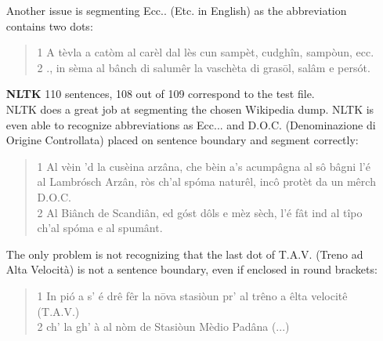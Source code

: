 \documentclass{hitec}
\begin{document}
\begin{itemize}
\begin{quote}
		\end{quote} 
		Another issue is segmenting Ecc.. (Etc. in English) as the abbreviation contains two dots:
		\begin{quote}
			1 A tèvla a catòm al carèl dal lès cun sampèt, cudghîn, sampòun, ecc. \\
			2 ., in sèma al bânch di salumêr la vaschèta di grasōl, salâm e persót.
		\end{quote}
		\item [\textbf{NLTK}] 110 sentences, 108 out of 109 correspond to the test file. \\
		NLTK does a great job at segmenting the chosen Wikipedia dump. NLTK is even able to recognize abbreviations as Ecc... and D.O.C. (Denominazione di Origine Controllata) placed on sentence boundary and segment correctly:
		\begin{quote}
			1 Al vèin 'd la cusèina arzâna, che bèin a's acumpâgna al sô bâgni l'é al Lambrósch Arzân, ròs ch'al spóma naturêl, incô protèt da un mêrch D.O.C. \\
			2 Al Biânch de Scandiân, ed góst dôls e mèz sèch, l'é fât ind al tîpo ch'al spóma e al spumânt.
		\end{quote}
		The only problem is not recognizing that the last dot of T.A.V. (Treno ad Alta Velocità) is not a sentence boundary, even if enclosed in round brackets:
		\begin{quote}
			1 In pió a s' é drê fêr la nōva stasiòun pr' al trêno a êlta velocitê (T.A.V.) \\
			2 ch' la gh' à al nòm de Stasiòun Mèdio Padâna (...)
		\end{quote}
	\end{itemize}
\end{document}
